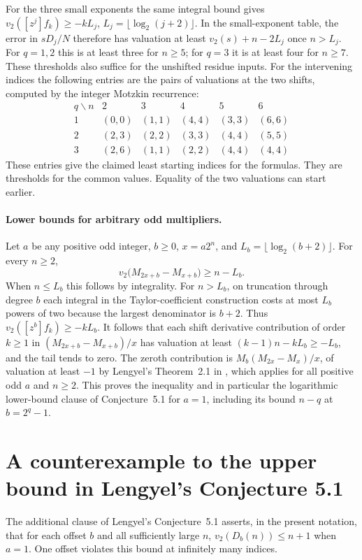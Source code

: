 \documentclass[11pt,a4paper]{article}
\begin{document}
For the three small exponents the same integral bound gives
$v_2([z^j]f_k)\ge-k L_j$, $L_j=\lfloor\log_2(j+2)\rfloor$.
In the small-exponent table, the error in $sD_j/N$ therefore has
valuation at least $v_2(s)+n-2L_j$ once $n>L_j$. For $q=1,2$ this
is at least three for $n\ge5$; for $q=3$ it is at least four for
$n\ge7$. These thresholds also suffice for the unshifted residue inputs.
For the intervening indices the following entries are the pairs of
valuations at the two shifts, computed by the integer Motzkin recurrence:
\[
\begin{array}{c|ccccc}
q\backslash n &2&3&4&5&6\\\hline
1 &(0,0)&(1,1)&(4,4)&(3,3)&(6,6)\\
2 &(2,3)&(2,2)&(3,3)&(4,4)&(5,5)\\
3 &(2,6)&(1,1)&(2,2)&(4,4)&(4,4)
\end{array}
\]
These entries give the claimed least starting indices for the formulas.
They are thresholds for the common values. Equality of the two
valuations can start earlier.

\paragraph{Lower bounds for arbitrary odd multipliers.}
Let $a$ be any positive odd integer, $b\ge0$, $x=a2^n$, and
$L_b=\lfloor\log_2(b+2)\rfloor$. For every $n\ge2$,
\[
 v_2\bigl(M_{2x+b}-M_{x+b}\bigr)\ge n-L_b.
\]
When $n\le L_b$ this follows by integrality. For $n>L_b$, on truncation
through degree $b$ each integral in the Taylor-coefficient construction
costs at most $L_b$ powers of two because the largest denominator is $b+2$.
Thus $v_2([z^b]f_k)\ge-kL_b$. It follows that each shift derivative
contribution of order $k\ge1$ in $(M_{2x+b}-M_{x+b})/x$ has valuation
at least $(k-1)n-kL_b\ge-L_b$, and the tail tends to zero.
The zeroth contribution is $M_b(M_{2x}-M_x)/x$, of valuation at least
$-1$ by Lengyel's Theorem~2.1 in \cite{lengyel13}, which applies for
all positive odd $a$ and $n\ge2$. This proves the inequality and in
particular the logarithmic lower-bound clause of Conjecture~5.1
for $a=1$, including its bound $n-q$ at $b=2^q-1$.


\section{A counterexample to the upper bound in Lengyel's Conjecture 5.1}\label{sec:counter}

The additional clause of Lengyel's Conjecture~5.1 asserts,
in the present notation, that for each offset $b$ and all sufficiently
large $n$, $v_2(D_b(n))\le n+1$ when $a=1$. One offset violates
this bound at infinitely many indices.
\end{document}
